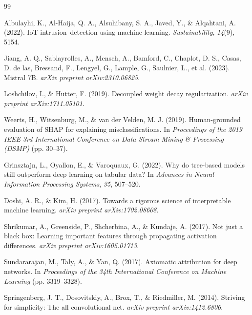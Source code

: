 \documentclass[sensors,apajournal,article,submit,moreauthors]{Definitions/mdpi}
\begin{document}
\begin{thebibliography}{99}

Albulayhi, K., Al-Haija, Q. A., Alsuhibany, S. A., Javed, Y., \& Alqahtani, A. (2022). {IoT} \mbox{intrusion detection} using machine learning. \textit{Sustainability}, \textit{14}(9), 5154.

Jiang, A. Q., Sablayrolles, A., Mensch, A., Bamford, C., Chaplot, D. S., Casas, D. de las, Bressand, F., Lengyel, G., Lample, G., Saulnier, L., et al. (2023). Mistral 7B. \textit{arXiv preprint arXiv:2310.06825}.

Loshchilov, I., \& Hutter, F. (2019). Decoupled weight decay regularization. \textit{arXiv preprint arXiv:1711.05101}.

Weerts, H., Witsenburg, M., \& van der Velden, M. J. (2019). Human-grounded evaluation of SHAP for explaining misclassifications. In \textit{Proceedings of the 2019 IEEE 3rd International Conference on Data Stream Mining \& Processing (DSMP)} (pp. 30--37).

Grinsztajn, L., Oyallon, E., \& Varoquaux, G. (2022). Why do tree-based models still outperform deep learning on tabular data? In \textit{Advances in Neural Information Processing Systems}, \textit{35}, 507--520.

Doshi, A. R., \& Kim, H. (2017). Towards a rigorous science of interpretable machine learning. \textit{arXiv preprint arXiv:1702.08608}.

Shrikumar, A., Greenside, P., Shcherbina, A., \& Kundaje, A. (2017). Not just a black box: Learning important features through propagating activation differences. \textit{arXiv preprint arXiv:1605.01713}.

Sundararajan, M., Taly, A., \& Yan, Q. (2017). Axiomatic attribution for deep networks. In \textit{Proceedings of the 34th International Conference on Machine Learning} (pp. 3319--3328).

Springenberg, J. T., Dosovitskiy, A., Brox, T., \& Riedmiller, M. (2014). Striving for simplicity: The all convolutional net. \textit{arXiv preprint arXiv:1412.6806}.


\end{thebibliography}
\end{document}
